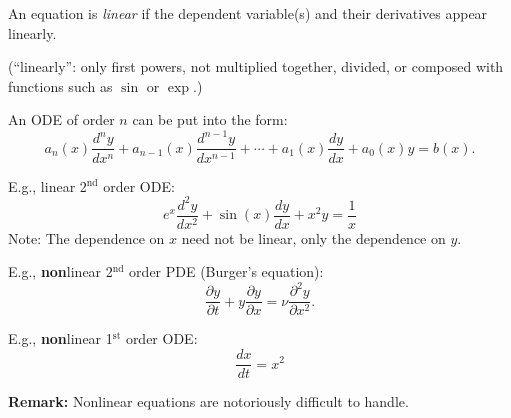 \documentclass[10pt,aspectratio=169]{beamer}
\begin{document}
\begin{frame}
An equation is \emph{linear} if the dependent variable(s) and their
derivatives appear linearly.

\pause

(``linearly'': only first powers, not multiplied together, divided, or composed
with functions such as $\sin$ or $\exp$.)

\medskip
\pause

An ODE of order $n$ can be put into the form:
\[
a_n(x) \frac{d^n y}{dx^n} + 
a_{n-1}(x) \frac{d^{n-1} y}{dx^{n-1}} + 
\cdots
+
a_{1}(x) \frac{dy}{dx}
+
a_{0}(x) y = b(x) .
\]

\medskip
\pause

E.g., linear 2${}^\text{nd}$ order ODE:
\vspace*{-5pt}
\[
e^x \frac{d^2 y}{dx^2} + 
\sin(x) \frac{d y}{dx} + 
x^2 y
=
\frac{1}{x}
\]
\pause
Note: The dependence on $x$ need not be linear, only the dependence on
$y$.

\medskip
\pause

E.g., \textbf{non}linear 2${}^{\text{nd}}$ order PDE (Burger's equation):
\[
\frac{\partial y}{\partial t} + 
y \frac{\partial y}{\partial x} =
\nu \frac{\partial^2 y}{\partial x^2} .
\]

\medskip
\pause

E.g., \textbf{non}linear 1${}^{\text{st}}$ order ODE:
\vspace*{-5pt}
\[
\frac{dx}{dt} = x^2
\]

\medskip
\pause

\textbf{Remark:} Nonlinear equations are notoriously difficult to handle.

\end{frame}
\end{document}
